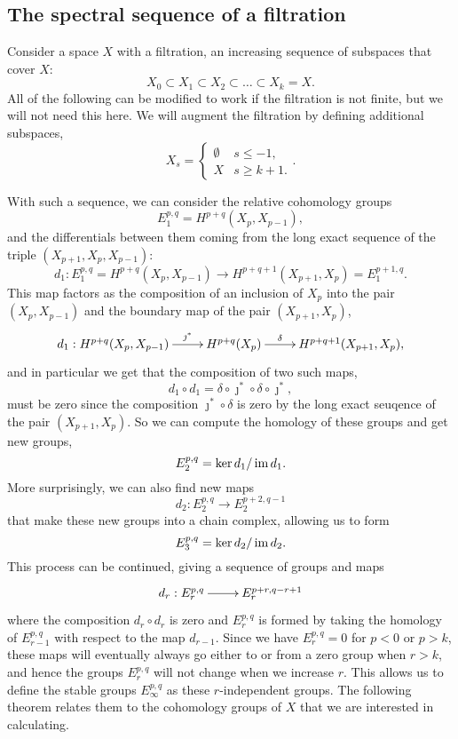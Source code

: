 \subsection{The spectral sequence of a filtration}
\label{sec:ss-filtration}

Consider a space $X$ with a filtration, an increasing sequence
of subspaces that cover $X$:
\[ X_0 \subset X_1 \subset X_2 \subset
\dots \subset X_k  = X. \]
All of the following can be modified to work if the filtration is not
finite, but we will not need this here. We will augment the filtration
by defining additional subspaces,
\[ X_s =
\begin{cases}
  \emptyset & s \leq -1, \\
  X & s \geq k+1.
\end{cases}. \]

With such a sequence, we can
consider the relative cohomology groups
\[ E_1^{p,q} = H^{p+q}(X_p,X_{p-1}), \]
and the differentials between them coming from the long exact sequence
of the triple $(X_{p+1},X_p,X_{p-1})$:
\[ d_1 : E_1^{p,q} = H^{p+q}(X_p,X_{p-1}) \to H^{p+q+1}(X_{p+1},X_p) =
E_1^{p+1,q}. \]
This map factors as the composition of an
inclusion of $X_p$ into the pair $(X_p,X_{p-1})$ and the boundary map
of the pair
$(X_{p+1},X_p)$,
\[ \xymatrix{ d_1 : H^{p+q}(X_p,X_{p-1}) \ar[r]^<<<<<{\jmath^*} &
  H^{p+q}(X_p) \ar[r]^<<<<<{\delta} & H^{p+q+1}(X_{p+1},X_p),
} \]
and in particular we get that the composition of two such maps,
\[ d_1 \circ d_1 = \delta \circ \jmath^* \circ \delta \circ
\jmath^*, \]
must be
zero since the composition $\jmath^*\circ\delta$ is zero by the
long exact seuqence of the pair $(X_{p+1},X_p)$. So we can compute the
homology of these groups and get new groups,
\[ E_2^{p,q} = \ker d_1 / \operatorname{im} d_1. \]
More surprisingly, we can also find new maps
\[ d_2 : E_2^{p,q} \to E_2^{p+2,q-1} \]
that make these new groups into a chain complex, allowing us to form
\[ E_3^{p,q} = \ker d_2 / \operatorname{im} d_2. \]
This process can be continued, giving a sequence of groups and maps
\[ \xymatrix{d_r : E_r^{p,q} \ar[r] & E_r^{p+r,q-r+1} } \]
where the composition $d_r \circ d_r$ is zero and
$E_r^{p,q}$ is formed by taking the homology of $E_{r-1}^{p,q}$ with
respect to the map $d_{r-1}$. Since we have $E_r^{p,q} = 0$ for $p <
0$ or $p > k$, these maps will eventually always go either to or from
a zero
group when $r > k$, and hence the groups $E_r^{p,q}$ will not change
when we
increase $r$. This allows us to
define the stable groups $E_\infty^{p,q}$ as these $r$-independent
groups. The following theorem relates them to the cohomology groups of
$X$ that we are interested in calculating.

